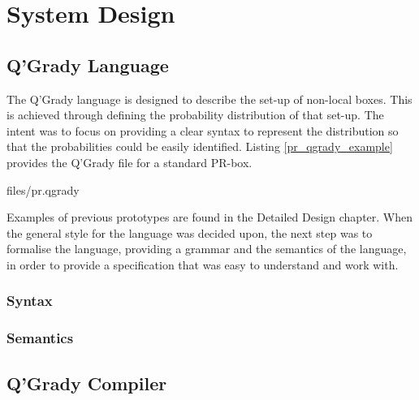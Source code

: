 \documentclass[report.tex]{subfiles}
\begin{document}
\chapter{System Design} %
\label{cha:system_design}
\section{Q'Grady Language} %
\label{sec:q_grady_language}
The Q'Grady language is designed to describe the set-up of non-local boxes.
This is achieved through defining the probability distribution of that set-up.
The intent was to focus on providing a clear syntax to represent the distribution
so that the probabilities could be easily identified.
Listing \ref{pr_qgrady_example} provides the Q'Grady file for a standard PR-box.


{files/pr.qgrady} 

Examples of previous prototypes are found in the Detailed Design chapter.
When the general style for the language was decided upon, the next step was to
formalise the language, providing a grammar and the semantics of the language,
in order to provide a specification that was easy to understand and work with.

\subsection{Syntax} %
\label{sub:syntax}

\subsection{Semantics} %
\label{sec:semantics}


\section{Q'Grady Compiler} %
\label{sec:q_grady_compiler}

\newpage
\end{document}
